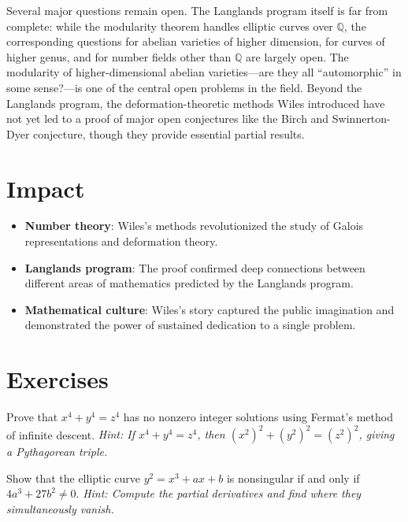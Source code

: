 Several major questions remain open. The Langlands program itself is far from complete: while the modularity theorem handles elliptic curves over $\mathbb{Q}$, the corresponding questions for abelian varieties of higher dimension, for curves of higher genus, and for number fields other than $\mathbb{Q}$ are largely open. The modularity of higher-dimensional abelian varieties---are they all ``automorphic'' in some sense?---is one of the central open problems in the field. Beyond the Langlands program, the deformation-theoretic methods Wiles introduced have not yet led to a proof of major open conjectures like the Birch and Swinnerton-Dyer conjecture, though they provide essential partial results.

\section{Impact}

\begin{itemize}
\item \textbf{Number theory}: Wiles's methods revolutionized the study of Galois representations and deformation theory.
\item \textbf{Langlands program}: The proof confirmed deep connections between different areas of mathematics predicted by the Langlands program.
\item \textbf{Mathematical culture}: Wiles's story captured the public imagination and demonstrated the power of sustained dedication to a single problem.
\end{itemize}

\section{Exercises}

\begin{exercise}[Basic]
Prove that $x^4 + y^4 = z^4$ has no nonzero integer solutions using Fermat's method of infinite descent. \emph{Hint: If $x^4 + y^4 = z^4$, then $(x^2)^2 + (y^2)^2 = (z^2)^2$, giving a Pythagorean triple.}
\end{exercise}

\begin{exercise}[Intermediate]
Show that the elliptic curve $y^2 = x^3 + ax + b$ is nonsingular if and only if $4a^3 + 27b^2 \neq 0$. \emph{Hint: Compute the partial derivatives and find where they simultaneously vanish.}
\end{exercise}

